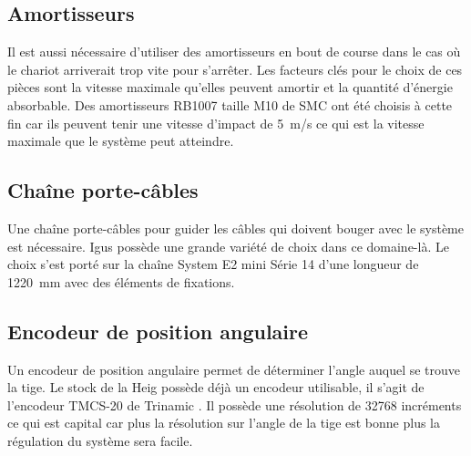 \subsection{Amortisseurs}
Il est aussi nécessaire d'utiliser des amortisseurs en bout de course dans le cas où le chariot arriverait trop vite pour s'arrêter. Les facteurs clés pour le choix
de ces pièces sont la vitesse maximale qu'elles peuvent amortir et la quantité d'énergie absorbable. Des amortisseurs RB1007 taille M10
de SMC \cite{SMC} ont été choisis à cette fin car ils peuvent tenir une vitesse d'impact de 5~m/s ce qui est la vitesse maximale que le système
peut atteindre.

\subsection{Chaîne porte-câbles}
Une chaîne porte-câbles pour guider les câbles qui doivent bouger avec le système est nécessaire. Igus \cite{Igus} possède une grande variété de choix dans
ce domaine-là. Le choix s'est porté sur la chaîne System E2 mini Série 14 d'une longueur de 1220~mm avec des éléments de fixations.

\subsection{Encodeur de position angulaire}
Un encodeur de position angulaire permet de déterminer l'angle auquel se trouve la tige. Le stock de la \acrshort{Heig} possède déjà un encodeur
utilisable, il s'agit de l'encodeur TMCS-20 de Trinamic \cite{Trinamic}. Il possède une résolution de 32768 incréments ce qui est capital car
plus la résolution sur l'angle de la tige est bonne plus la régulation du système sera facile.